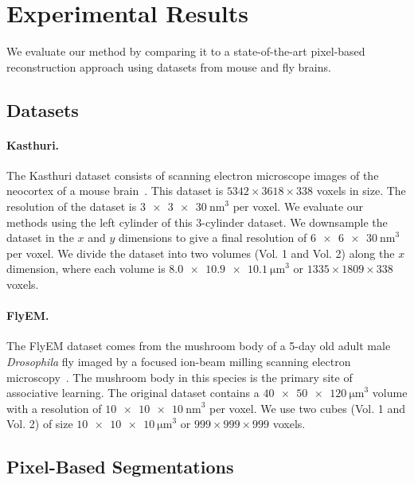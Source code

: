 \section{Experimental Results}
We evaluate our method by comparing it to a state-of-the-art pixel-based reconstruction approach using datasets from mouse and fly brains.

\subsection{Datasets}
\label{sec:dataset}

\paragraph{Kasthuri.}
The Kasthuri dataset consists of scanning electron microscope images of the neocortex of a mouse brain~\cite{kasthuri2015saturated}. 
This dataset is $5342 \times 3618 \times 338$ voxels in size. 
The resolution of the dataset is $\SI[product-units=single]{3 x 3 x 30}{\nano\meter}^3$ per voxel. 
We evaluate our methods using the left cylinder of this 3-cylinder dataset. 
We downsample the dataset in the $x$ and $y$ dimensions to give a final resolution of $\SI[product-units=single]{6 x 6 x 30}{\nano\meter}^3$ per voxel. 
We divide the dataset into two volumes (Vol. 1 and Vol. 2) along the $x$ dimension, where each volume is $\SI[product-units=single]{8.0 x 10.9 x 10.1}{\micro\meter}^3$ or $1335 \times 1809 \times 338$ voxels.

\paragraph{FlyEM.}
The FlyEM dataset comes from the mushroom body of a 5-day old adult male \textit{Drosophila} fly imaged by a focused ion-beam milling scanning electron microscopy~\cite{takemura2017connectome}.
The mushroom body in this species is the primary site of associative learning. 
The original dataset contains a $\SI[product-units=single]{40 x 50 x 120}{\micro\meter}^3$ volume with a resolution of $\SI[product-units=single]{10 x 10 x 10}{\nano\meter}^3$ per voxel. 
We use two cubes (Vol. 1 and Vol. 2) of size $\SI[product-units=single]{10 x 10 x 10}{\micro\meter}^3$ or $999 \times 999 \times 999$ voxels.

\subsection{Pixel-Based Segmentations}
\label{sec:neuroproof}

